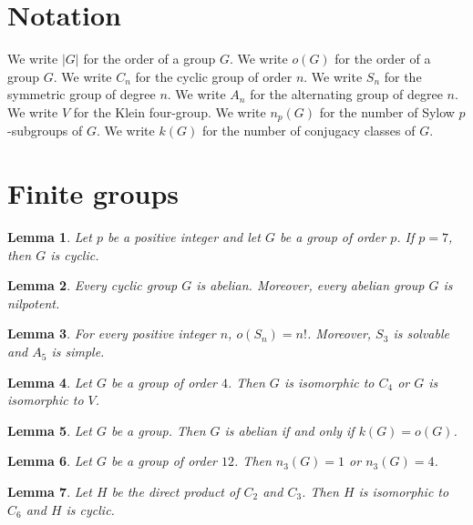 \documentclass{article}
\newtheorem{lemma}{Lemma}
\begin{document}
\section{Notation}

We write $|G|$ for the order of a group $G$.
We write $o(G)$ for the order of a group $G$.
We write $C_n$ for the cyclic group of order $n$.
We write $S_n$ for the symmetric group of degree $n$.
We write $A_n$ for the alternating group of degree $n$.
We write $V$ for the Klein four-group.
We write $n_p(G)$ for the number of Sylow $p$-subgroups of $G$.
We write $k(G)$ for the number of conjugacy classes of $G$.

\section{Finite groups}

\begin{lemma}\label{prime}
Let $p$ be a positive integer and let $G$ be a group of order $p$. If $p=7$, then $G$ is cyclic.
\end{lemma}

\begin{lemma}\label{cyclic}
Every cyclic group $G$ is abelian. Moreover, every abelian group $G$ is nilpotent.
\end{lemma}

\begin{lemma}\label{symmetric}
For every positive integer $n$, $o(S_n)=n!$. Moreover, $S_3$ is solvable and $A_5$ is simple.
\end{lemma}

\begin{lemma}\label{four}
Let $G$ be a group of order $4$. Then $G$ is isomorphic to $C_4$ or $G$ is isomorphic to $V$.
\end{lemma}

\begin{lemma}\label{classes}
Let $G$ be a group. Then $G$ is abelian if and only if $k(G)=o(G)$.
\end{lemma}

\begin{lemma}\label{sylow}
Let $G$ be a group of order $12$. Then $n_3(G)=1$ or $n_3(G)=4$.
\end{lemma}

\begin{lemma}\label{product}
Let $H$ be the direct product of $C_2$ and $C_3$. Then $H$ is isomorphic to $C_6$ and $H$ is cyclic.
\end{lemma}
\end{document}
